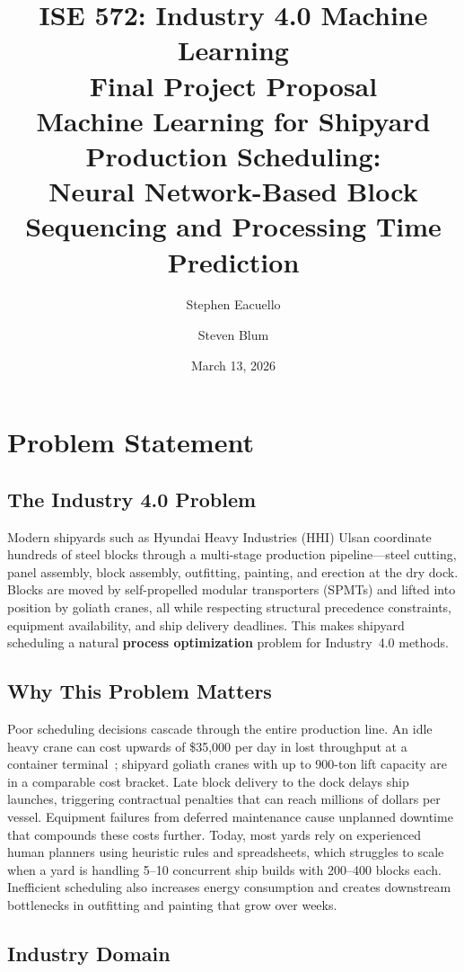 \documentclass[12pt,letterpaper]{article}
\title{%
  \textbf{ISE 572: Industry 4.0 Machine Learning} \\[0.3em]
  \Large Final Project Proposal \\[0.5em]
  \large Machine Learning for Shipyard Production Scheduling: \\
  Neural Network-Based Block Sequencing and Processing Time Prediction
}
\author{Stephen Eacuello \and Steven Blum}
\date{March 13, 2026}
\begin{document}
\maketitle
\thispagestyle{empty}

\section{Problem Statement}

\subsection{The Industry 4.0 Problem}

Modern shipyards such as Hyundai Heavy Industries (HHI) Ulsan coordinate hundreds of steel blocks through a multi-stage production pipeline---steel cutting, panel assembly, block assembly, outfitting, painting, and erection at the dry dock. Blocks are moved by self-propelled modular transporters (SPMTs) and lifted into position by goliath cranes, all while respecting structural precedence constraints, equipment availability, and ship delivery deadlines. This makes shipyard scheduling a natural \textbf{process optimization} problem for Industry~4.0 methods.

\subsection{Why This Problem Matters}

Poor scheduling decisions cascade through the entire production line. An idle heavy crane can cost upwards of \$35,000 per day in lost throughput at a container terminal~\cite{gantrex2017}; shipyard goliath cranes with up to 900-ton lift capacity are in a comparable cost bracket. Late block delivery to the dock delays ship launches, triggering contractual penalties that can reach millions of dollars per vessel. Equipment failures from deferred maintenance cause unplanned downtime that compounds these costs further. Today, most yards rely on experienced human planners using heuristic rules and spreadsheets, which struggles to scale when a yard is handling 5--10 concurrent ship builds with 200--400 blocks each. Inefficient scheduling also increases energy consumption and creates downstream bottlenecks in outfitting and painting that grow over weeks.

\subsection{Industry Domain}
\end{document}
